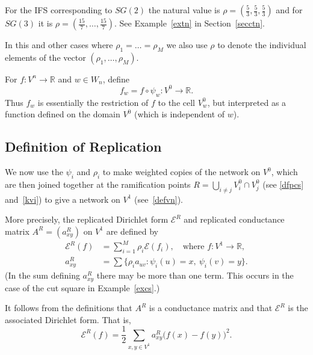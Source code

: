 \documentclass[a4paper]{amsart}
\theoremstyle{plain}
\theoremstyle{definition}
\theoremstyle{remark}
\begin{document}
 
For the IFS corresponding to $ SG(2) $ the natural value is $ \rho = (\frac{5}{3}, \frac{5}{3}  , \frac{5}{3} ) $ and for $ SG(3) $ it is $   \rho = (\frac{15}{7}, \dots  , \frac{15}{7} ) $.   See Example~\ref{extn} in Section~\ref{secctn}.
 

In this and other cases where $ \rho_1 = \dots = \rho_M $ we also use $ \rho $ to denote the individual elements of the vector $  (\rho_1,\dots, \rho_M) $.  

\medskip For $ f:V^{n} \to \mathbb{R} $ and $ w \in W_n $, define 
\begin{equation} \label{}
f_w = f\circ \psi_w:V^{0} \to \mathbb{R}.  
\end{equation} 
Thus $ f_w $ is essentially the restriction of $ f $ to the cell $ V^{0}_w $,  but  interpreted as a function defined on the domain $  V^{0} $ (which is independent of $ w $).  


\subsection{Definition of Replication}  \label{secdfr}   We now  use the $ \psi_i$ and $  \rho_i $ to make  weighted copies of the network on $ V^{0} $, which are then joined together at the ramification points $ R = \bigcup_{i\neq j}V_i^{0} \cap V_j^{0} $ (see \eqref{dfpcs} and~\eqref{kvi}) to give a network on $ V^{1} $ (see~\eqref{defvn}). 


More precisely, the replicated Dirichlet form $ \mathcal{E} ^R $ and replicated conductance matrix $ A^R = (a^R_{xy})$ on $ V^{1} $ are defined by
\begin{align}
\mathcal{E} ^R (f) &= \sum_{i=1}^M   \rho_i \mathcal{E} (f_i ), \quad \text{where } f:V^{1} \to \mathbb{R} ,\label{repen}\\
a^R_{xy}&= \sum  \{\rho_i a_{uv} : \psi_i(u) = x, \ \psi_i(v) = y \}.\label{repmat}
\end{align} 
(In the sum defining $ a^R_{xy} $ there may be more than one term.  This occurs in the case of the cut square  in Example~\ref{excs}.)

It follows from the definitions that $ A^R $ is a conductance matrix and that $ \mathcal{E} ^R $ is the associated Dirichlet form.  That is,
\begin{equation} \label{}
\mathcal{E} ^R(f) = \frac{1}{2} \sum_{x,y \in V^{1}} a^R_{xy} \big(f(x) - f(y)\big)^2.
\end{equation} 
\end{document}
